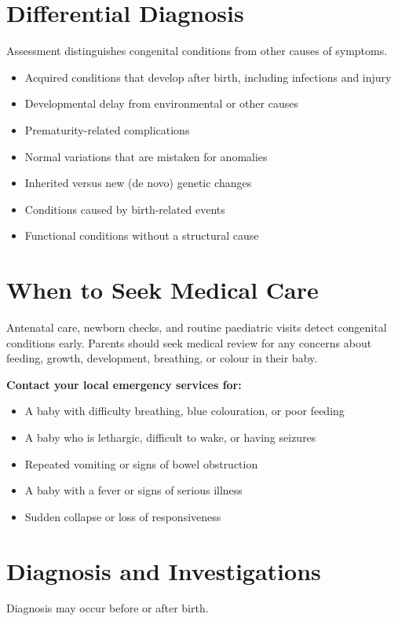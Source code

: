 \section*{Differential Diagnosis}
Assessment distinguishes congenital conditions from other causes of symptoms.

\begin{itemize}
    \item Acquired conditions that develop after birth, including infections and injury
    \item Developmental delay from environmental or other causes
    \item Prematurity-related complications
    \item Normal variations that are mistaken for anomalies
    \item Inherited versus new (de novo) genetic changes
    \item Conditions caused by birth-related events
    \item Functional conditions without a structural cause
\end{itemize}

\section*{When to Seek Medical Care}
Antenatal care, newborn checks, and routine paediatric visits detect congenital conditions early. Parents should seek medical review for any concerns about feeding, growth, development, breathing, or colour in their baby.

\textbf{Contact your local emergency services for:}
\begin{itemize}
    \item A baby with difficulty breathing, blue colouration, or poor feeding
    \item A baby who is lethargic, difficult to wake, or having seizures
    \item Repeated vomiting or signs of bowel obstruction
    \item A baby with a fever or signs of serious illness
    \item Sudden collapse or loss of responsiveness
\end{itemize}

\section*{Diagnosis and Investigations}
Diagnosis may occur before or after birth.


